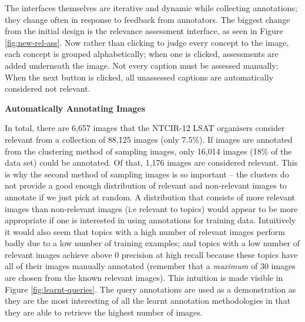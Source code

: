 The interfaces themselves are iterative and dynamic while collecting annotations; they change often in response to feedback from annotators. The biggest change from the initial design is the relevance assessment interface, as seen in Figure \ref{fig:new-rel-ass}. Now rather than clicking to judge every concept to the image, each concept is grouped alphabetically; when one is clicked, assessments are added underneath the image. Not every caption must be assessed manually: When the next button is clicked, all unassessed captions are automatically considered not relevant. 

\textbf{Automatically Annotating Images}

In total, there are 6,657 images that the NTCIR-12 LSAT organisers consider relevant from a collection of 88,125 images (only 7.5\%). If images are annotated from the clustering method of sampling images, only 16,014 images (18\% of the data set) could be annotated. Of that, 1,176 images are considered relevant. This is why the second method of sampling images is so important -- the clusters do not provide a good enough distribution of relevant and non-relevant images to annotate if we just pick at random. A distribution that consists of more relevant images than non-relevant images (i.e relevant to topics) would appear to be more appropriate if one is interested in using annotations for training data. Intuitively it would also seem that topics with a high number of relevant images perform badly due to a low number of training examples; and topics with a low number of relevant images achieve above $0$ precision at high recall because these topics have all of their images manually annotated (remember that a \textit{maximum} of $30$ images are chosen from the known relevant images). This intuition is made visible in Figure \ref{fig:learnt-queries}. The query annotations are used as a demonstration as they are the most interesting of all the learnt annotation methodologies in that they are able to retrieve the highest number of images.

